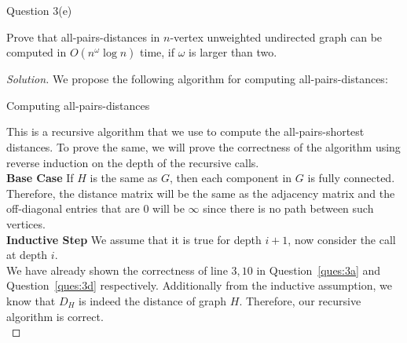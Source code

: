 \begin{solution}{Question 3(e)}
    \begin{question}
        Prove that all-pairs-distances in $n$-vertex unweighted undirected graph can be computed in $O(n^\omega\log{n})$ time, if $\omega$ is larger than two.
    \end{question}
    \tcblower{}
    \begin{proof}[Solution]
      We propose the following algorithm for computing all-pairs-distances:
      \begin{algorithm}[H]
        \caption{Computing all-pairs-distances}\label{alg:all}
        \begin{algorithmic}[1]
            \EndIf{}
          \EndProcedure{}
        \end{algorithmic}
      \end{algorithm}
      This is a recursive algorithm that we use to compute the all-pairs-shortest distances. To prove the same, we will prove the correctness of the algorithm using reverse induction on the depth of the recursive calls.\\

      \textbf{Base Case} If $H$ is the same as $G$, then each component in $G$ is fully connected. Therefore, the distance matrix will be the same as the adjacency matrix and the off-diagonal entries that are $0$ will be $\infty$ since there is no path between such vertices.\\
      \textbf{Inductive Step} We assume that it is true for depth $i+1$, now consider the call at depth $i$.\\
      We have already shown the correctness of line $3, 10$ in Question~\ref{ques:3a} and Question~\ref{ques:3d} respectively. Additionally from the inductive assumption, we know that $D_H$ is indeed the distance of graph $H$. Therefore, our recursive algorithm is correct.\\


\end{proof}
\end{solution}

